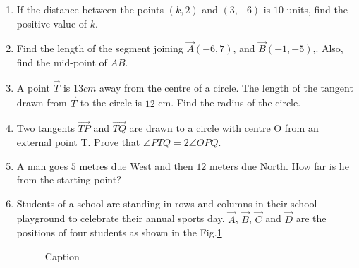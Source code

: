 \documentclass{article}
\begin{document}
\begin{enumerate}
\item  If the distance between the points $(k, 2)$ and $(3,-6)$ is $10$ units, find the positive value of $k$. 
			
\item  Find the length of the segment joining $\vec{A}(-6, 7)$, and $\vec{B}(-1, -5)$,. Also, find the mid-point of $AB$. 
	
\item  A point $\vec{T}$ is $13 cm$ away from the centre of a circle. The length of the tangent drawn from $\vec{T}$ to the circle is $12$ cm. Find the radius of the circle. 
	
\item  Two tangents $ \vec{TP} $ and $ \vec{TQ} $ are drawn to a circle with centre O from an external point T. Prove that $\angle PTQ= 2 \angle OPQ$. 

\item  A man goes $5$ metres due West and then $12$ meters due North. How far is he from the starting point?

\item Students of a school are standing in rows and columns in their school playground to celebrate their annual sports day. $\vec{A}$, $\vec{B}$, $\vec{C}$ and $\vec{D}$ are the positions of four students as shown in the Fig.\ref{fig:3}

	\begin{figure}[!h]
	\centering
	
	\caption{Caption}
	\label{fig:3}
        \end{figure}	
	

\end{enumerate}
\end{document}
